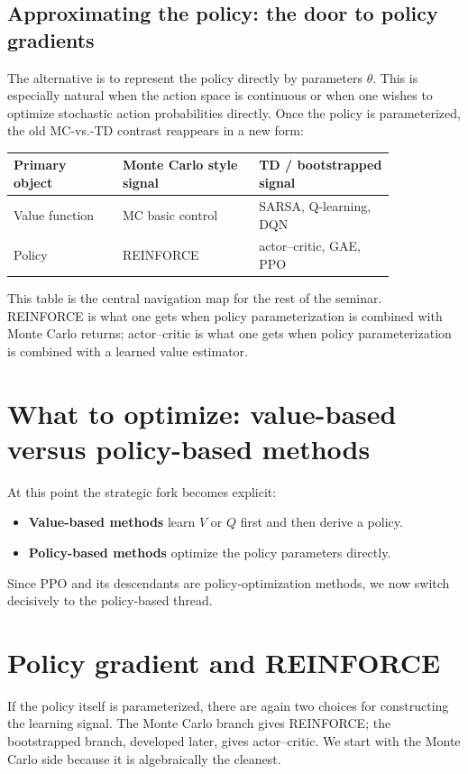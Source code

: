 \documentclass[11pt]{article}
\newcommand{\1}{\mathbf{1}}
\begin{document}
\subsection{Approximating the policy: the door to policy gradients}

The alternative is to represent the policy directly by parameters $\theta$. This is especially natural when the action space is continuous or when one wishes to optimize stochastic action probabilities directly. Once the policy is parameterized, the old MC-vs.-TD contrast reappears in a new form:
\begin{center}
\begin{tabular}{p{0.24\linewidth}p{0.30\linewidth}p{0.30\linewidth}}
\toprule
Primary object & Monte Carlo style signal & TD / bootstrapped signal \\
\midrule
Value function & MC basic control & SARSA, Q-learning, DQN \\
Policy & REINFORCE & actor--critic, GAE, PPO \\
\bottomrule
\end{tabular}
\end{center}
This table is the central navigation map for the rest of the seminar. REINFORCE is what one gets when policy parameterization is combined with Monte Carlo returns; actor--critic is what one gets when policy parameterization is combined with a learned value estimator.

\section{What to optimize: value-based versus policy-based methods}

At this point the strategic fork becomes explicit:
\begin{itemize}
    \item \textbf{Value-based methods} learn $V$ or $Q$ first and then derive a policy.
    \item \textbf{Policy-based methods} optimize the policy parameters directly.
\end{itemize}
Since PPO and its descendants are policy-optimization methods, we now switch decisively to the policy-based thread.

\section{Policy gradient and REINFORCE}

If the policy itself is parameterized, there are again two choices for constructing the learning signal. The Monte Carlo branch gives REINFORCE; the bootstrapped branch, developed later, gives actor--critic. We start with the Monte Carlo side because it is algebraically the cleanest.
\end{document}

